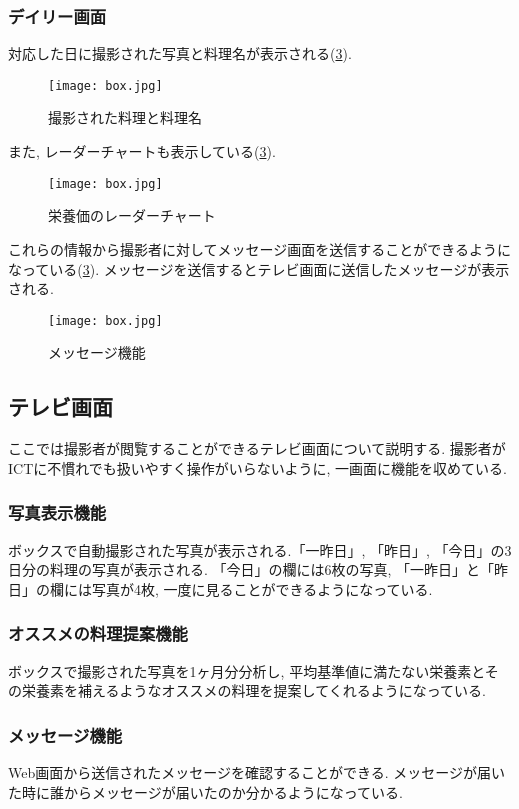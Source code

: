 \documentclass[../report]{subfiles}
\begin{document}
\subsubsection{デイリー画面}
対応した日に撮影された写真と料理名が表示される(\ref{fig:box}).

\begin{figure}[htbp]
    \begin{center}
        \texttt{[image: box.jpg]}
        \caption{撮影された料理と料理名}
        \label{fig:box}
    \end{center}
\end{figure}

また, レーダーチャートも表示している(\ref{fig:box}).

\begin{figure}[htbp]
    \begin{center}
        \texttt{[image: box.jpg]}
        \caption{栄養価のレーダーチャート}
        \label{fig:box}
    \end{center}
\end{figure}

これらの情報から撮影者に対してメッセージ画面を送信することができるようになっている(\ref{fig:box}).
メッセージを送信するとテレビ画面に送信したメッセージが表示される.

\begin{figure}[htbp]
    \begin{center}
        \texttt{[image: box.jpg]}
        \caption{メッセージ機能}
        \label{fig:box}
    \end{center}
\end{figure}

\subsection{テレビ画面}
ここでは撮影者が閲覧することができるテレビ画面について説明する.
撮影者がICTに不慣れでも扱いやすく操作がいらないように, 一画面に機能を収めている.

\subsubsection{写真表示機能}
ボックスで自動撮影された写真が表示される.「一昨日」, 「昨日」, 「今日」の3日分の料理の写真が表示される.
「今日」の欄には6枚の写真, 「一昨日」と「昨日」の欄には写真が4枚, 一度に見ることができるようになっている.

\subsubsection{オススメの料理提案機能}
ボックスで撮影された写真を1ヶ月分分析し, 平均基準値に満たない栄養素とその栄養素を補えるようなオススメの料理を提案してくれるようになっている.

\subsubsection{メッセージ機能}
Web画面から送信されたメッセージを確認することができる.
メッセージが届いた時に誰からメッセージが届いたのか分かるようになっている.
\end{document}
